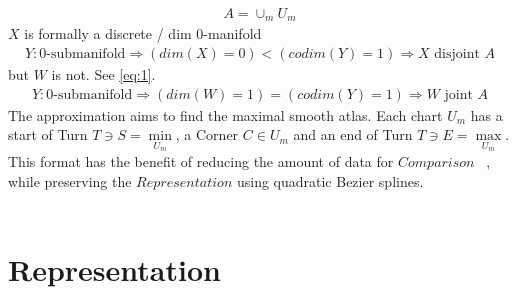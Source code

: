 \documentclass{report}
\begin{document}
\begin{align}
A = \cup_{m}U_{m}
\end{align}
$X$ is formally a discrete / dim 0-manifold
\begin{align}
Y: \text{0-submanifold} \Rightarrow (dim(X)=0)<(codim(Y)=1) \Rightarrow X \text{ disjoint } A
\end{align}
but $W$ is not. See \eqref{eq:1}.
\begin{align}
Y: \text{0-submanifold} \Rightarrow (dim(W)=1)=(codim(Y)=1) \Rightarrow W \text{ joint } A
\end{align}
The approximation aims to find the maximal smooth atlas. Each chart $U_{m}$ has a start of Turn $T \ni S = \min \limits _{U_{m}}$, a Corner $C \in U_{m}$ and an end of Turn $T \ni E = \max \limits _{U_{m}}$. This format has the benefit of reducing the amount of data for $Comparison$ ~\cite[Stopeight\_Comparator.tex]{Comparator}, while preserving the $Representation$ using quadratic Bezier splines.\\\\

\chapter{Representation}
\end{document}
